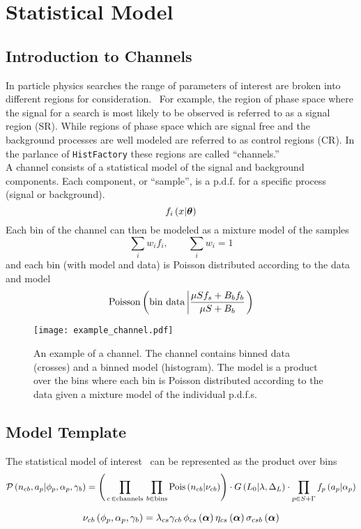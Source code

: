 \section{Statistical Model}

\subsection{Introduction to Channels}

In particle physics searches the range of parameters of interest are broken into different regions for consideration.~\cite{Cranmer:2015nia,Baak:2014wma}
For example, the region of phase space where the signal for a search is most likely to be observed is referred to as a signal region (SR).
While regions of phase space which are signal free and the background processes are well modeled are referred to as control regions (CR).
In the parlance of \texttt{HistFactory} these regions are called ``channels.''~\cite{Cranmer:2012sba}\\

A channel consists of a statistical model of the signal and background components.
Each component, or ``sample'', is a p.d.f. for a specific process (signal or background).
\[
 f_i\left({x | \boldsymbol{\theta}}\right)
\]
Each bin of the channel can then be modeled as a mixture model of the samples
\[
 \sum_i w_i f_i, \qquad \sum_i w_i = 1
\]
and each bin (with model and data) is Poisson distributed according to the data and model
\[
 \text{Poisson}\left({\text{bin data} \left|\frac{\mu S f_s + B_b f_b}{\mu S + B_b}\right.}\right)
\]

\begin{figure}[htpb]
 \center%
 \texttt{[image: example\_channel.pdf]}
 \caption{An example of a channel.
  The channel contains binned data (crosses) and a binned model (histogram).
  The model is a product over the bins where each bin is Poisson distributed according to the data given a mixture model of the individual p.d.f.s.}\label{fig:example_channel}
\end{figure}

\subsection{Model Template}

The statistical model of interest~\cite{Cranmer:2012sba} can be represented as the product over bins
\begin{equation}
 \mathcal{P}\left({n_{cb}, a_p | \phi_p, \alpha_p, \gamma_b}\right) = \left({\,\prod_{c\, \in \text{channels}} \,\prod_{b \in \text{bins}} \text{Pois}\left({n_{cb} | \nu_{cb}}\right)}\right) \cdot G\left({L_0 | \lambda, \Delta_L}\right) \cdot \prod_{p \in S + \Gamma} f_p \left({a_p | \alpha_p}\right)
 \label{eq:model}
\end{equation}


\begin{equation}
 \nu_{cb}\left({\phi_p, \alpha_p, \gamma_b}\right) = \lambda_{cs} \gamma_{cb}\, \phi_{cs}\left({\boldsymbol{\alpha}}\right) \eta_{cs} \left({\boldsymbol{\alpha}}\right) \sigma_{csb} \left({\boldsymbol{\alpha}}\right)
 \label{eq:mean_number_events}
\end{equation}
